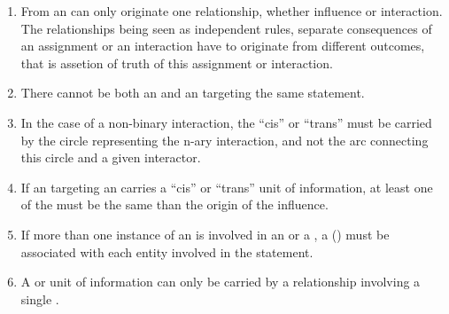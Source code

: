 \begin{enumerate}
\item From an  can only originate one relationship, whether influence or interaction. The relationships being seen as independent rules, separate consequences of an assignment or an interaction have to originate from different outcomes, that is assetion of truth of this assignment or interaction.
\item There cannot be both an  and an  targeting the same statement.
\item In the case of a non-binary interaction, the ``cis'' or ``trans''  must be carried by the circle representing the n-ary interaction, and not the arc connecting this circle and a given interactor.
\item If an  targeting an  carries a ``cis'' or ``trans'' unit of information, at least one of the  must be the same  than the origin of the influence. 
\item If more than one instance of an  is involved in an  or a , a   () must be associated with each entity involved in the statement.
\item A  or  unit of information can only be carried by a relationship involving a single .
\end{enumerate}  

\normalcolor